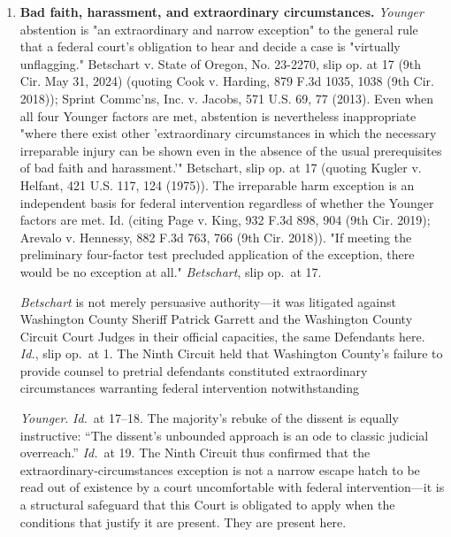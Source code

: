 \documentclass[12pt,letterpaper]{article}
\newenvironment{subparas}{%
	\begin{enumerate}[label=\alph*.,leftmargin=0.75in,itemsep=0pt,%
		parsep=0pt,topsep=4pt]%
	}{%
	\end{enumerate}%
}
\begin{document}
\begin{subparas}
		\item \textbf{Bad faith, harassment, and extraordinary circumstances.}
		\textit{Younger} abstention is "an extraordinary and narrow exception" to the general rule that a federal court's obligation to hear and decide a case is "virtually unflagging." Betschart v. State of Oregon, No. 23-2270, slip op. at 17 (9th Cir. May 31, 2024) (quoting Cook v. Harding, 879 F.3d 1035, 1038 (9th Cir. 2018)); Sprint Commc'ns, Inc. v. Jacobs, 571 U.S. 69, 77 (2013). Even when all four Younger factors are met, abstention is nevertheless inappropriate "where there exist other 'extraordinary circumstances in which the necessary irreparable injury can be shown even in the absence of the usual prerequisites of bad faith and harassment.'" Betschart, slip op. at 17 (quoting Kugler v. Helfant, 421 U.S. 117, 124 (1975)). The irreparable harm exception is an independent basis for federal intervention regardless of whether the Younger factors are met. Id. (citing Page v. King, 932 F.3d 898, 904 (9th Cir. 2019); Arevalo v. Hennessy, 882 F.3d 763, 766 (9th Cir. 2018)). "If meeting the preliminary four-factor test precluded application of the exception, there would be no exception at all." \textit{Betschart}, slip op.\ at 17.
		
		\textit{Betschart} is not merely persuasive authority---it was
		litigated against Washington County Sheriff Patrick Garrett and
		the Washington County Circuit Court Judges in their official
		capacities, the same Defendants here. \textit{Id.}, slip op.\ at
		1. The Ninth Circuit held that Washington County's failure to
		provide counsel to pretrial defendants constituted extraordinary
		circumstances warranting federal intervention notwithstanding
		
		\textit{Younger}. \textit{Id.}\ at 17--18.
		The majority's rebuke of the dissent is equally instructive:
		``The dissent's unbounded approach is an ode to classic judicial overreach.'' \textit{Id.}\ at 19. The Ninth Circuit thus confirmed that the extraordinary-circumstances exception is not a narrow escape hatch to be read out of existence by a court uncomfortable with federal intervention---it is a structural safeguard that this Court is obligated to apply when the conditions that justify it are present.
		They are present here.
		

\end{subparas}
\end{document}
